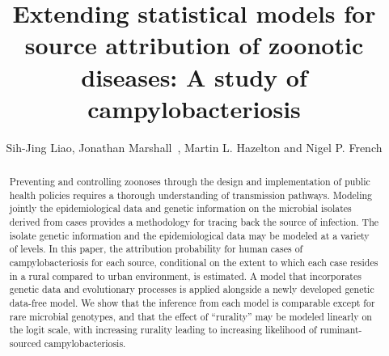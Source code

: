 \documentclass[times, doublespace]{simauth}%
\begin{document}
\title{Extending statistical models for source attribution of zoonotic diseases: A study of campylobacteriosis}
\author{Sih-Jing Liao,
Jonathan Marshall\corrauth\ \footnotemark[2], Martin L. Hazelton and Nigel P. French}
\address{ Institute of Fundamental Sciences-Statistics, Massey University, Palmerston North, New Zealand\\
 mEpiLab, Hopkirk Research Institute, Massey University, Palmerston North, New Zealand}

\begin{abstract}

Preventing and controlling zoonoses through the design and implementation of public health policies requires a thorough understanding of transmission pathways. Modeling jointly the epidemiological data and genetic information on the microbial isolates derived from cases provides a methodology for tracing back the source of infection. The isolate genetic information and the epidemiological data may be modeled at a variety of levels. In this paper, the attribution probability for human cases of campylobacteriosis for each source, conditional on the extent to which each case resides in a rural compared to urban environment, is estimated. A model that incorporates genetic data and evolutionary processes is applied alongside a newly developed genetic data-free model. We show that the inference from each model is comparable except for rare microbial genotypes, and that the effect of ``rurality'' may be modeled linearly on the logit scale, with increasing rurality leading to increasing likelihood of ruminant-sourced campylobacteriosis.

\end{abstract}

\maketitle
\end{document}
